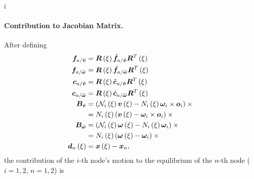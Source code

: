i\paragraph{Contribution to Jacobian Matrix.}
After defining
\begin{subequations}
\begin{align}
	\bm{f}_{a/\tilde{\bm{v}}} &= \bm{R}\left( \xi \right) \tilde{\bm{f}}_{a/\tilde{\bm{v}}} \bm{R}^T\left( \xi \right) \\
	\bm{f}_{a/\tilde{\bm{\omega}}} &= \bm{R}\left( \xi \right) \tilde{\bm{f}}_{a/\tilde{\bm{\omega}}} \bm{R}^T\left( \xi \right) \\
	\bm{c}_{a/\tilde{\bm{v}}} &= \bm{R}\left( \xi \right) \tilde{\bm{c}}_{a/\tilde{\bm{v}}} \bm{R}^T\left( \xi \right) \\
	\bm{c}_{a/\tilde{\bm{\omega}}} &= \bm{R}\left( \xi \right) \tilde{\bm{c}}_{a/\tilde{\bm{\omega}}} \bm{R}^T\left( \xi \right) \\
	\bm{B}_{\tilde{\bm{v}}} &= \left( 
		\mathcal{N}_i\left( \xi \right) \bm{v}\left( \xi \right)
		- N_i\left( \xi \right) \bm{\omega}_i \times \bm{o}_i
	 \right) \times{}
	\nonumber \\
	&= N_i\left( \xi \right) \left( 
		\bm{v}\left( \xi \right)
		- \bm{\omega}_i \times \bm{o}_i
	 \right) \times{}
	\\
	\bm{B}_{\tilde{\bm{\omega}}} &= \left( 
		\mathcal{N}_i\left( \xi \right) \bm{\omega}\left( \xi \right)
		- N_i\left( \xi \right) \bm{\omega}_i
	 \right) \times{}
	\nonumber \\
	&= N_i\left( \xi \right) \left( 
		\bm{\omega}\left( \xi \right)
		- \bm{\omega}_i
	 \right) \times{}
	\\
	\bm{d}_n\left( \xi \right) &= \bm{x}\left( \xi \right) - \bm{x}_n
	,
\end{align}
\end{subequations}
the contribution of the $i$-th node's motion to the equilibrium
of the $n$-th node ($i=1,2$, $n=1,2$) is
